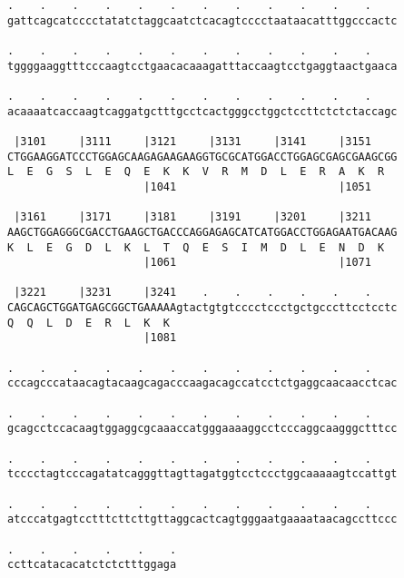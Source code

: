 \documentclass{article}
\begin{document}
\begin{Verbatim}
.    .    .    .    .    .    .    .    .    .    .    .    
gattcagcatcccctatatctaggcaatctcacagtcccctaataacatttggcccactc
                                                            
.    .    .    .    .    .    .    .    .    .    .    .    
tggggaaggtttcccaagtcctgaacacaaagatttaccaagtcctgaggtaactgaaca
                                                            
.    .    .    .    .    .    .    .    .    .    .    .    
acaaaatcaccaagtcaggatgctttgcctcactgggcctggctccttctctctaccagc
                                                            
 |3101     |3111     |3121     |3131     |3141     |3151    
CTGGAAGGATCCCTGGAGCAAGAGAAGAAGGTGCGCATGGACCTGGAGCGAGCGAAGCGG
L  E  G  S  L  E  Q  E  K  K  V  R  M  D  L  E  R  A  K  R  
                     |1041                         |1051    
  
 |3161     |3171     |3181     |3191     |3201     |3211    
AAGCTGGAGGGCGACCTGAAGCTGACCCAGGAGAGCATCATGGACCTGGAGAATGACAAG
K  L  E  G  D  L  K  L  T  Q  E  S  I  M  D  L  E  N  D  K  
                     |1061                         |1071    
  
 |3221     |3231     |3241    .    .    .    .    .    .    
CAGCAGCTGGATGAGCGGCTGAAAAAgtactgtgtcccctccctgctgcccttcctcctc
Q  Q  L  D  E  R  L  K  K                                   
                     |1081                                  
  
.    .    .    .    .    .    .    .    .    .    .    .    
cccagcccataacagtacaagcagacccaagacagccatcctctgaggcaacaacctcac
                                                            
.    .    .    .    .    .    .    .    .    .    .    .    
gcagcctccacaagtggaggcgcaaaccatgggaaaaggcctcccaggcaagggctttcc
                                                            
.    .    .    .    .    .    .    .    .    .    .    .    
tcccctagtcccagatatcagggttagttagatggtcctccctggcaaaaagtccattgt
                                                            
.    .    .    .    .    .    .    .    .    .    .    .    
atcccatgagtcctttcttcttgttaggcactcagtgggaatgaaaataacagccttccc
                                                            
.    .    .    .    .    .
ccttcatacacatctctctttggaga
                          
                          
 

\end{Verbatim}
\end{document}

